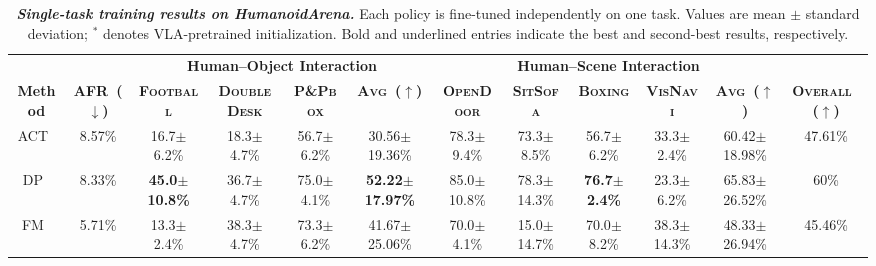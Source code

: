 


  




\begin{table}[H]
  \caption{
    \textbf{\textit{Single-task training results on HumanoidArena.}} Each policy is fine-tuned independently on one task. Values are mean $\pm$ standard deviation; $^{*}$ denotes VLA-pretrained initialization. Bold and underlined entries indicate the best and second-best results, respectively.
  }
  \label{tab:arena_single_task}
  \centering
  \begin{adjustbox}{max width=\textwidth}
  \setlength{\tabcolsep}{4.2pt}
  \renewcommand{\arraystretch}{1.08}

  \begin{tabular}{cccccc|cccccc}
  \toprule
  & &
  \multicolumn{4}{c|}{\textbf{Human--Object Interaction}} &
  \multicolumn{5}{c}{\textbf{Human--Scene Interaction}} & \\
  \cmidrule(lr){3-6}
  \cmidrule(lr){7-11}

  \multirow{-2}{*}{\textbf{Method}} &
  \multirow{-2}{*}{\textbf{AFR~($\downarrow$)}} &
  \textbf{\textsc{Football}} &
  \textbf{\textsc{DoubleDesk}} &
  \textbf{\textsc{P\&Pbox}} &
  \textbf{\textsc{Avg~($\uparrow$)}} &
  \textbf{\textsc{OpenDoor}} &
  \textbf{\textsc{SitSofa}} &
  \textbf{\textsc{Boxing}} &
  \textbf{\textsc{VisNavi}} &
  \textbf{\textsc{Avg~($\uparrow$)}} &
  \multirow{-2}{*}{\textbf{\textsc{Overall~($\uparrow$)}}} \\
  
  \midrule
  ACT~\cite{ACT}
  & 8.57\%
  & 16.7$\pm$6.2\%
  & 18.3$\pm$4.7\%
  & 56.7$\pm$6.2\%
  & 30.56$\pm$19.36\%
  & 78.3$\pm$9.4\%
  & 73.3$\pm$8.5\%
  & 56.7$\pm$6.2\%
  & 33.3$\pm$2.4\%
  & 60.42$\pm$18.98\%   & 47.61\% \\

  DP~\cite{chi2023diffusionpolicy}
  & 8.33\%
  & \textbf{45.0$\pm$10.8\%}
  & 36.7$\pm$4.7\%
  & 75.0$\pm$4.1\%
  & \textbf{52.22$\pm$17.97\%}
  & 85.0$\pm$10.8\%
  & 78.3$\pm$14.3\%
  & \textbf{76.7$\pm$2.4\%}
  & 23.3$\pm$6.2\%
  & 65.83$\pm$26.52\%   & 60\% \\

  FM~\cite{FM_objective}
  & 5.71\%
  & 13.3$\pm$2.4\%
  & 38.3$\pm$4.7\%
  & 73.3$\pm$6.2\%
  & 41.67$\pm$25.06\%
  & 70.0$\pm$4.1\%
  & 15.0$\pm$14.7\%
  & 70.0$\pm$8.2\%
  & 38.3$\pm$14.3\%
  & 48.33$\pm$26.94\%   & 45.46\% \\


\end{tabular}
\end{adjustbox}
\end{table}

